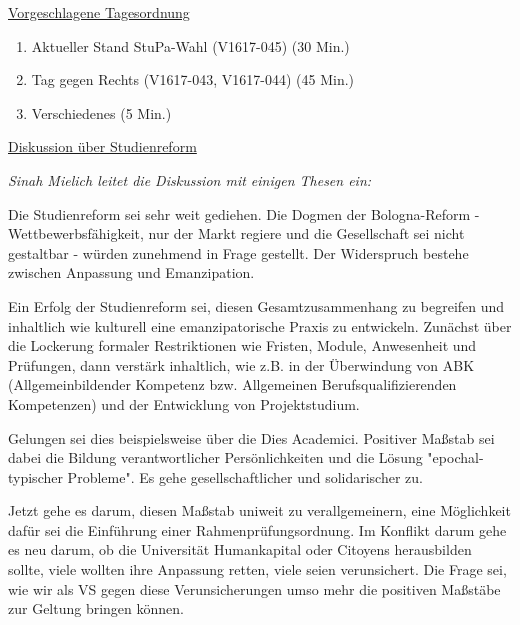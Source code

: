\documentclass[ngerman,headheight=70pt]{scrartcl}
\begin{document}
    \newpage
    \underline{Vorgeschlagene Tagesordnung}
    \begin{enumerate}[label={\textbf{Top \theenumi}},leftmargin=*]
        \item Aktueller Stand StuPa-Wahl (V1617-045) (30 Min.)
        \item Tag gegen Rechts (V1617-043, V1617-044) (45 Min.)
        \item Verschiedenes (5 Min.)
    \end{enumerate}

    \newpage


    {\Large \underline{Diskussion über Studienreform}}

    \textit{Sinah Mielich leitet die Diskussion mit einigen Thesen ein:}

    Die Studienreform sei sehr weit gediehen. Die Dogmen der Bologna-Reform -
    Wettbewerbsfähigkeit, nur der Markt regiere und die Gesellschaft sei nicht
    gestaltbar - würden zunehmend in Frage gestellt. Der Widerspruch bestehe
    zwischen Anpassung und Emanzipation.

    Ein Erfolg der Studienreform sei, diesen Gesamtzusammenhang zu begreifen und
    inhaltlich wie kulturell eine emanzipatorische Praxis zu entwickeln. Zunächst
    über die Lockerung formaler Restriktionen wie Fristen, Module, Anwesenheit
    und Prüfungen, dann verstärk inhaltlich, wie z.B. in der Überwindung von ABK
    (Allgemeinbildender Kompetenz bzw. Allgemeinen Berufsqualifizierenden
    Kompetenzen) und der Entwicklung von Projektstudium.

    Gelungen sei dies beispielsweise über die Dies Academici. Positiver Maßstab
    sei dabei die Bildung verantwortlicher Persönlichkeiten und die Lösung
    "epochal-typischer Probleme". Es gehe gesellschaftlicher und solidarischer
    zu.

    Jetzt gehe es darum, diesen Maßstab uniweit zu verallgemeinern, eine
    Möglichkeit dafür sei die Einführung einer Rahmenprüfungsordnung. Im
    Konflikt darum gehe es neu darum, ob die Universität Humankapital oder
    Citoyens herausbilden sollte, viele wollten ihre Anpassung retten, viele
    seien verunsichert. Die Frage sei, wie wir als VS gegen diese
    Verunsicherungen umso mehr die positiven Maßstäbe zur Geltung bringen können.
\end{document}
